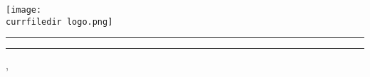\clearpage

\pagestyle{blank}


\begin{titlepage}
    \centering

    \textbf{\uppercase{\Large\university}}

    \uppercase{\faculty}

    \vspace{64pt}

    \texttt{[image: \\currfiledir logo.png]}

    \vspace{64pt}

    \textbf{\uppercase{\large {}}}

    \parbox[c][\baselineskip]{\textwidth}{\vfill\rule{\textwidth}{0.5pt}\vfill}

    \hspace{0.1\textwidth}
    \textbf{\uppercase{\Large {}}}
    \hspace{0.1\textwidth}

    \parbox[c][\baselineskip]{\textwidth}{\vfill\rule{\textwidth}{0.5pt}\vfill}

    \vspace{\baselineskip}

    \begin{minipage}{0.25\linewidth}
    \end{minipage}%
    \begin{minipage}[t]{0.75\linewidth}
        \ifthenelse{\equal{\group}{}}{\dotfill}{\group}
    \end{minipage}

    \vspace{\baselineskip}

    \begin{minipage}{0.25\linewidth}
    \end{minipage}%
    \begin{minipage}[t]{0.75\linewidth}
        \ifthenelse{\equal{\instructors}{}}{\dotfill}{\instructors}
    \end{minipage}

    \vspace{\baselineskip}

    \begin{minipage}{0.25\linewidth}
    \end{minipage}%
    \begin{minipage}[t]{0.75\linewidth}
        \ifthenelse{\equal{\implementers}{}}{\dotfill}{\implementers}
    \end{minipage}

    \vfill

    \location, 

\end{titlepage}

\clearpage

